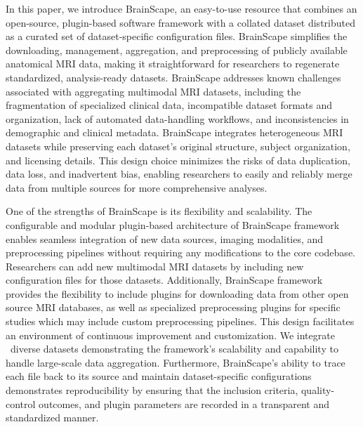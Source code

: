 In this paper, we introduce BrainScape, an easy-to-use resource that combines an open-source, 
plugin-based software framework with a collated dataset distributed as a curated set of 
dataset-specific configuration files.
BrainScape simplifies the downloading, management, aggregation, and preprocessing of publicly available anatomical MRI data, 
making it straightforward for researchers to regenerate standardized, analysis-ready datasets.
BrainScape addresses known challenges associated with aggregating multimodal MRI datasets, 
including the fragmentation of specialized clinical data, incompatible dataset formats and organization, 
lack of automated data-handling workflows, and inconsistencies in demographic and clinical metadata.
BrainScape integrates heterogeneous MRI datasets while preserving each dataset's original structure, 
subject organization, and licensing details.
This design choice minimizes the risks of data duplication, data loss, and inadvertent bias, 
enabling researchers to easily and reliably merge data from multiple sources 
for more comprehensive analyses.

One of the strengths of BrainScape is its flexibility and scalability. 
The configurable and modular plugin-based architecture of BrainScape framework enables 
seamless integration of new data sources, imaging modalities, and preprocessing pipelines without requiring any modifications to the core codebase.
Researchers can add new multimodal MRI datasets by including new configuration files for those datasets.
Additionally, BrainScape framework provides the flexibility to include plugins for downloading data from other open source MRI databases, 
as well as specialized preprocessing plugins for specific studies which may include custom preprocessing pipelines.
This design facilitates an environment of continuous improvement and customization.
We integrate \NumDatasets\ diverse datasets demonstrating the framework's scalability 
and capability to handle large-scale data aggregation.
Furthermore, BrainScape's ability to trace each file back to its source and maintain 
dataset-specific configurations demonstrates reproducibility by ensuring that the inclusion criteria, 
quality-control outcomes, and plugin parameters are recorded in a transparent and standardized manner.

